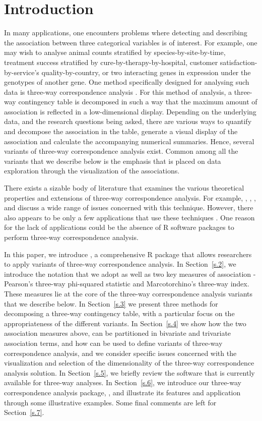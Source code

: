 \section{Introduction}
In many applications, one encounters problems where detecting and describing the association between three categorical variables is of interest. For example, one may wish to analyse animal counts stratified by species-by-site-by-time, treatment success stratified by cure-by-therapy-by-hospital, customer satisfaction-by-service's quality-by-country, or two interacting genes in expression under the genotypes of another gene. One method specifically designed for analysing such data is three-way correspondence analysis \cite[]{carkro96}. For this method of analysis, a three-way contingency table is decomposed in such a way that the maximum amount of association is reflected in a low-dimensional display. Depending on the underlying data, and the research questions being asked, there are various ways to quantify and decompose the association in the table, generate a visual display of the association and calculate the accompanying numerical summaries. Hence, several variants of three-way correspondence analysis exist. Common among all the variants that we describe below is the emphasis that is placed on data exploration through the visualization of the associations. 

There exists a sizable body of literature that examines the various theoretical properties and extensions of three-way correspondence analysis. For example, \citet{kro89}, \citet[]{carkro96}, \citet[Chap. 17]{kro08}, \citet[Chap. 11]{behlom14} and \citet{lombehkro21} discuss a wide range of issues concerned with this technique. However, there also appears to be only a few applications that use these techniques \cite[]{carkro98, vel07,lombehgue19}. One reason for the lack of applications could be the absence of R software packages  to perform three-way correspondence analysis. 

In this paper, we introduce , a comprehensive R package that allows researchers to apply variants of three-way correspondence analysis. In Section~\ref{s.2}, we introduce the notation that we adopt as well as two key measures of association - Pearson's three-way phi-squared statistic and Marcotorchino's three-way index. These measures lie at the core of the three-way correspondence analysis variants that we describe below. In Section~\ref{s.3} we present three methods for decomposing a three-way contingency table,  with a particular focus on the appropriateness of the different variants. In Section~\ref{s.4} we show how the two association measures above,  can be partitioned in bivariate and trivariate association terms, and how can be used to define variants of three-way correspondence analysis, and we consider specific issues concerned with the visualization and selection of the dimensionality of the three-way correspondence analysis solution. 
In Section~\ref{s.5}, we briefly review the software that is currently available for three-way analyses. In Section~\ref{s.6}, we introduce our three-way correspondence analysis package, , and illustrate its features and application through some illustrative examples. Some final comments are left for Section~\ref{s.7}.

